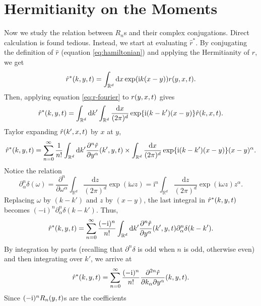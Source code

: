 \documentclass{book}
\newcommand{\mathd}{\mathrm{d}}
\newcommand{\mathi}{\mathrm{i}}
\newcommand{\mathpi}{\pi}
\begin{document}
\section{Hermitianity on the Moments}\label{section:Hermitianity on Moments}

Now we study the relation between $R_n$s and their complex conjugations.
Direct calculation is found tedious. Instead, we start at evaluating
$\hat{r}^{\ast}$. By conjugating the definition of $\hat{r}$ (equation
\ref{eq:hamiltonian}) and applying the Hermitianity of $r$, we get
\[ {\color[HTML]{000000}\hat{r}^{\ast}  (k, y, t)} = \int_{\mathbb{R}^d}
   \mathd x \exp (\mathi k (x - y)) {\color[HTML]{000000}r (y, x, t)} . \]
Then, applying equation \ref{eq:r-fourier} to ${\color[HTML]{000000}r (y, x,
t)}$ gives
\[ {\color[HTML]{000000}\hat{r}^{\ast}  (k, y, t)} = \int_{\mathbb{R}^d}
   \mathd k'  \int_{\mathbb{R}^d} \frac{\mathd x}{(2 \mathpi)^d} \exp \{\mathi
   (k - k') (x - y)\} {\color[HTML]{000000}\hat{r}  (k, x, t)} . \]
Taylor expanding ${\color[HTML]{000000}\hat{r}  (k', x, t)}$ by $x$ at $y$,
\[ {\color[HTML]{000000}\hat{r}^{\ast}  (k, y, t)} = \sum_{n = 0}^{\infty}
   \frac{1}{n!}  \int_{\mathbb{R}^d} \mathd k'  \frac{\partial^n 
   {\color[HTML]{000000}\hat{r}}}{\partial y^{\alpha}}  (k', y, t) \times
   \int_{\mathbb{R}^d} \frac{\mathd x}{(2 \mathpi)^d} \exp \{\mathi (k - k')
   (x - y)\}  (x - y)^{\alpha} . \]
Notice the relation
\[ \partial_{\alpha}^n \delta (\omega) = \frac{\partial^n}{\partial
   \omega^{\alpha}}  \int_{\mathbb{R}^d} \frac{\mathd z}{(2 \mathpi)^d} \exp
   (\mathi \omega z) = \mathi^n  \int_{\mathbb{R}^d} \frac{\mathd z}{(2
   \mathpi)^d} \exp (\mathi \omega z) z^{\alpha} . \]
Replacing $\omega$ by $(k - k')$ and $z$ by $(x - y)$, the last integral in
${\color[HTML]{000000}\hat{r}^{\ast}  (k, y, t)}$ becomes $(- \mathi)^n
\partial^n_{\alpha} \delta (k - k')$. Thus,
\[ {\color[HTML]{000000}\hat{r}^{\ast}  (k, y, t)} = \sum_{n = 0}^{\infty}
   \frac{(- \mathi)^n}{n!}  \int_{\mathbb{R}^d} \mathd k'  \frac{\partial^n 
   {\color[HTML]{000000}\hat{r}}}{\partial y^{\alpha}}  (k', y, t)
   \partial^n_{\alpha} \delta (k - k') . \]
By integration by parts (recalling that $\partial^n \delta$ is odd when $n$ is
odd, otherwise even) and then integrating over $k'$, we arrive at
\[ {\color[HTML]{000000}\hat{r}^{\ast}  (k, y, t)} = \sum_{n = 0}^{\infty}
   \frac{(- \mathi)^n}{n!}  \frac{\partial^{2 n} 
   {\color[HTML]{000000}\hat{r}}}{\partial k_{\alpha} \partial y^{\alpha}} 
   (k, y, t) . \]
Since $(- \mathi)^n {\color[HTML]{000000}R_n  (y, t)}$s are the coefficients
\end{document}
